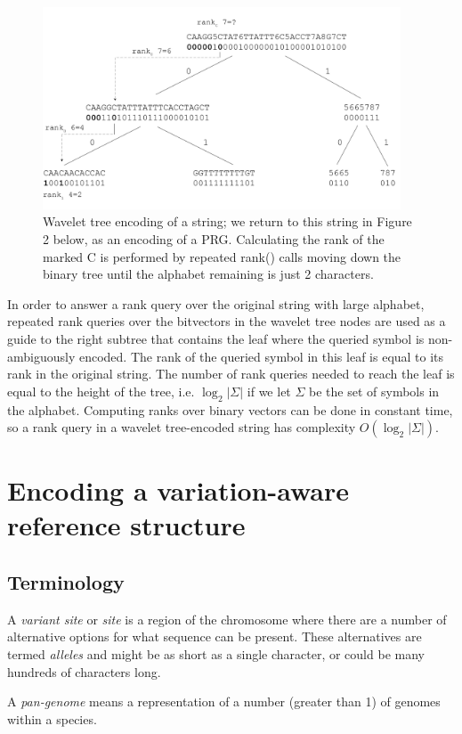 \documentclass[runningheads,a4paper]{llncs}
\begin{document}
 \begin{figure}
\centering
\includegraphics[height=6cm]{wavelet_tree.png}
\caption{Wavelet tree encoding of a string; we return to this string in Figure 2 below, as an encoding of a PRG. Calculating the rank of the marked C is performed by repeated rank() calls moving down the binary tree until the alphabet remaining is just 2 characters.}
\label{fig:wt}
\end{figure}

In order to answer a rank query over the original string with large alphabet, repeated rank queries over the bitvectors in the wavelet tree nodes are used as a guide to the right subtree that contains the leaf where the queried symbol is non-ambiguously encoded. The rank of the queried symbol in this leaf is equal to its rank in the original string. The number of rank queries needed to reach the leaf is equal to the height of the tree, i.e. $\log_{2} {|\Sigma|}$ if we let $\Sigma$ be the set of symbols in the alphabet. Computing ranks over binary vectors can be done in constant time, so a rank query in a wavelet tree-encoded string has complexity $O(\log_{2} {|\Sigma|})$. 

\section{Encoding a variation-aware reference structure}

\subsection{Terminology}
A \textit{variant site} or \textit{site} is a region of the chromosome where there are a number of alternative options for what sequence can be present.
These alternatives are termed \textit{alleles} and might be as short as a single character, or could be many hundreds of characters long. 

A  \textit{pan-genome} means a representation of a number (greater than 1) of genomes within a species. 
\end{document}
